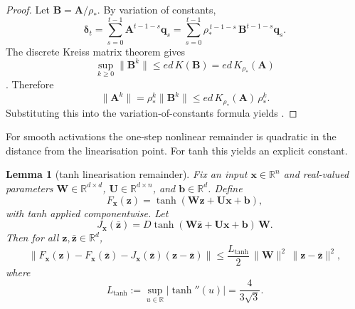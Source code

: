 \documentclass{article}
\newtheorem{lemma}[theorem]{Lemma}
\theoremstyle{remark}
\newcommand{\R}{\mathbb{R}}
\newcommand{\bz}{\mathbf{z}}
\newcommand{\bx}{\mathbf{x}}
\newcommand{\bW}{\mathbf{W}}
\newcommand{\bU}{\mathbf{U}}
\begin{document}
\begin{proof}
Let $\mathbf{B} = \mathbf{A}/\rho_\ast$. By variation of constants,
\[
  \boldsymbol{\delta}_t
  = \sum_{s=0}^{t-1} \mathbf{A}^{t-1-s} \mathbf{q}_s
  = \sum_{s=0}^{t-1} \rho_\ast^{\,t-1-s}\,\mathbf{B}^{t-1-s}\mathbf{q}_s.
\]
The discrete Kreiss matrix theorem gives
\[
  \sup_{k \geq 0}\|\mathbf{B}^k\| \leq e d\,K(\mathbf{B})
  = e d\,K_{\rho_\ast}(\mathbf{A})
\]
\citep{trefethen2005spectra}. Therefore
\[
  \|\mathbf{A}^k\|
  = \rho_\ast^k \|\mathbf{B}^k\|
  \leq e d\,K_{\rho_\ast}(\mathbf{A})\,\rho_\ast^k.
\]
Substituting this into the variation-of-constants formula yields
.
\end{proof}

For smooth activations the one-step nonlinear remainder is quadratic in the
distance from the linearisation point. For tanh this yields an explicit
constant.

\begin{lemma}[tanh linearisation remainder]
\label{lemma:tanh_remainder}
Fix an input $\bx\in\R^n$ and real-valued parameters
$\bW\in\R^{d\times d}$, $\bU\in\R^{d\times n}$, and $\mathbf{b}\in\R^d$.
Define
\[
  F_{\bx}(\bz) = \tanh(\bW\bz + \bU\bx + \mathbf{b}),
\]
with tanh applied componentwise. Let
\[
  J_{\bx}(\bar{\bz})
  = D\tanh(\bW\bar{\bz} + \bU\bx + \mathbf{b})\,\bW.
\]
Then for all $\bz,\bar{\bz} \in \R^d$,
\begin{equation}
  \|F_{\bx}(\bz) - F_{\bx}(\bar{\bz})
  - J_{\bx}(\bar{\bz})(\bz - \bar{\bz})\|
  \leq \frac{L_{\tanh}}{2}\,\|\bW\|^2\,\|\bz - \bar{\bz}\|^2,
  \label{eq:tanh_remainder}
\end{equation}
where
\[
  L_{\tanh}
  := \sup_{u \in \R} |\tanh''(u)|
  = \frac{4}{3\sqrt{3}}.
\]
\end{lemma}
\end{document}
